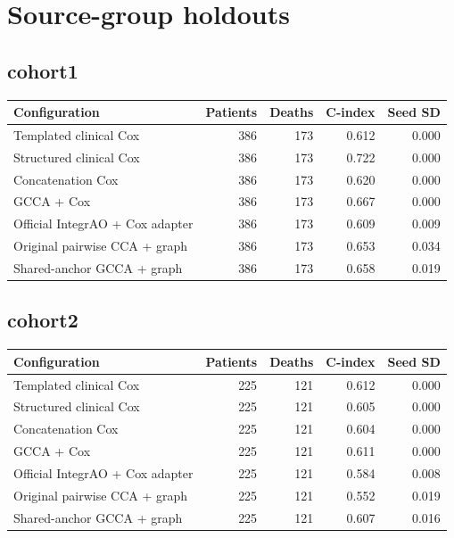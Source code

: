 \documentclass[10pt]{article}
\begin{document}
\section{Source-group holdouts}
\subsection{cohort1}
\begin{center}
\footnotesize
\begin{tabular}{lrrrr}\hline
Configuration & Patients & Deaths & C-index & Seed SD\\\hline
Templated clinical Cox & 386 & 173 & 0.612 & 0.000\\
Structured clinical Cox & 386 & 173 & 0.722 & 0.000\\
Concatenation Cox & 386 & 173 & 0.620 & 0.000\\
GCCA + Cox & 386 & 173 & 0.667 & 0.000\\
Official IntegrAO + Cox adapter & 386 & 173 & 0.609 & 0.009\\
Original pairwise CCA + graph & 386 & 173 & 0.653 & 0.034\\
Shared-anchor GCCA + graph & 386 & 173 & 0.658 & 0.019\\
\hline\end{tabular}
\end{center}
\subsection{cohort2}
\begin{center}
\footnotesize
\begin{tabular}{lrrrr}\hline
Configuration & Patients & Deaths & C-index & Seed SD\\\hline
Templated clinical Cox & 225 & 121 & 0.612 & 0.000\\
Structured clinical Cox & 225 & 121 & 0.605 & 0.000\\
Concatenation Cox & 225 & 121 & 0.604 & 0.000\\
GCCA + Cox & 225 & 121 & 0.611 & 0.000\\
Official IntegrAO + Cox adapter & 225 & 121 & 0.584 & 0.008\\
Original pairwise CCA + graph & 225 & 121 & 0.552 & 0.019\\
Shared-anchor GCCA + graph & 225 & 121 & 0.607 & 0.016\\
\hline\end{tabular}
\end{center}
\end{document}
